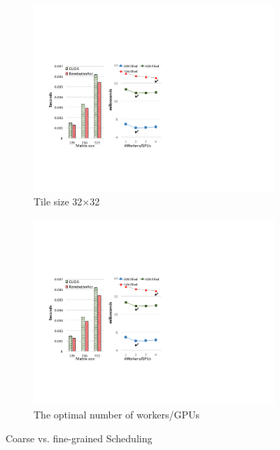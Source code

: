 \begin{figure}[htb]
\centering
\begin{subfigure}{0.23\textwidth}
\includegraphics[width=\textwidth]{figures/choleskyScheResults.pdf}
\caption{Tile size 32$\times$32}
\label{choleskySche}
\end{subfigure}
\begin{subfigure}{0.23\textwidth}
\includegraphics[width=\textwidth]{figures/nWorkers.pdf}
\caption{The optimal number of workers/GPUs}
\label{fig:nWorkers}
\end{subfigure}
\caption{Coarse vs. fine-grained Scheduling}
\label{fig:coarseFine}
\end{figure}


